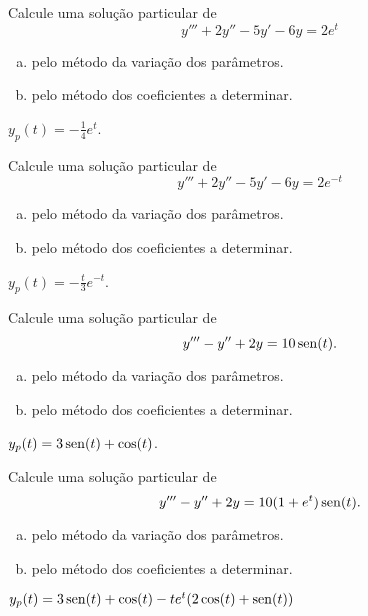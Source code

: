 \begin{exer}
  Calcule uma solução particular de
  \begin{equation}
    y''' + 2y'' - 5y' - 6y = 2e^t
  \end{equation}
  \begin{enumerate}[a)]
  \item pelo método da variação dos parâmetros.
  \item pelo método dos coeficientes a determinar.
  \end{enumerate}
\end{exer}
\begin{resp}
  $y_p(t) = -\frac{1}{4}e^{t}$.
\end{resp}

\begin{exer}
  Calcule uma solução particular de
  \begin{equation}
    y''' + 2y'' - 5y' - 6y = 2e^{-t}
  \end{equation}
  \begin{enumerate}[a)]
  \item pelo método da variação dos parâmetros.
  \item pelo método dos coeficientes a determinar.
  \end{enumerate}
\end{exer}
\begin{resp}
  $y_p(t) = -\frac{t}{3}e^{-t}$.
\end{resp}

\begin{exer}
  Calcule uma solução particular de
  \begin{equation}
    y''' - y'' + 2y = 10\operatorname{sen}(t).
  \end{equation}
  \begin{enumerate}[a)]
  \item pelo método da variação dos parâmetros.
  \item pelo método dos coeficientes a determinar.
  \end{enumerate}
\end{exer}
\begin{resp}
  $y_p(t) = 3\operatorname{sen}(t) + \cos(t)$.
\end{resp}

\begin{exer}
  Calcule uma solução particular de
  \begin{equation}
    y''' - y'' + 2y = 10(1 + e^t)\operatorname{sen}(t).
  \end{equation}
  \begin{enumerate}[a)]
  \item pelo método da variação dos parâmetros.
  \item pelo método dos coeficientes a determinar.
  \end{enumerate}
\end{exer}
\begin{resp}
  $y_p(t) = 3\operatorname{sen}(t) + \cos(t) - te^{t}(2\cos(t) + \operatorname{sen}(t))$
\end{resp}
